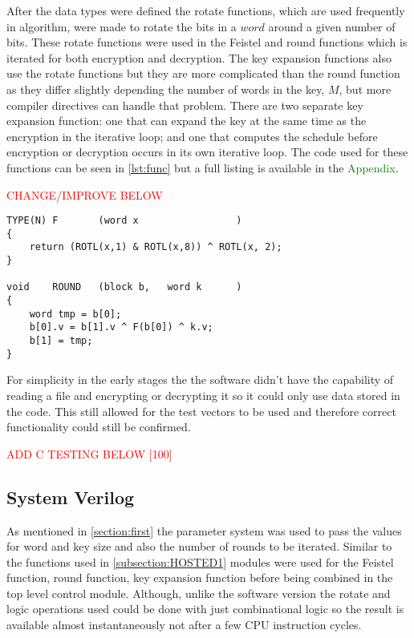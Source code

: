 \documentclass[12pt,twoside,a4paper]{report}
\begin{document}
	After the data types were defined the rotate functions, which are used frequently in algorithm, were made to rotate the bits in a $word$ around a given number of bits. These rotate functions were used in the Feistel and round functions which is iterated for both encryption and decryption. The key expansion functions also use the rotate functions but they are more complicated than the round function as they differ slightly depending the number of words in the key, $M$, but more compiler directives can handle that problem. There are two separate key expansion function: one that can expand the key at the same time as the encryption in the iterative loop; and one that computes the schedule before encryption or decryption occurs in its own iterative loop. The code used for these functions can be seen in \autoref{lst:func} but a full listing is available in the \textcolor{green}{Appendix}. 
    
	\textcolor{red}{CHANGE/IMPROVE BELOW} 
    
	\begin{lstlisting}[label={lst:func},caption={Round and Feistel functions},style=CStyle]
TYPE(N)	F		(word x					)
{
	return (ROTL(x,1) & ROTL(x,8)) ^ ROTL(x, 2);
}

void	ROUND	(block b,	word k		)
{	
	word tmp = b[0];
	b[0].v = b[1].v ^ F(b[0]) ^ k.v;
	b[1] = tmp;
}
	\end{lstlisting}
    
	For simplicity in the early stages the the software didn't have the capability of reading a file and encrypting or decrypting it so it could only use data stored in the code. This still allowed for the test vectors to be used and therefore correct functionality could still be confirmed.
    
	\textcolor{red}{ADD C TESTING BELOW [100]}
    
	\subsection{System Verilog}
	\label{subsection:SV1}
	As mentioned in \autoref{section:first} the parameter system was used to pass the values for word and key size and also the number of rounds to be iterated. Similar to the functions used in \autoref{subsection:HOSTED1} modules were used for the Feistel function, round function, key expansion function before being combined in the top level control module. Although, unlike the software version the rotate and logic operations used could be done with just combinational logic so the result is available almost instantaneously not after a few CPU instruction cycles.
	
\end{document}
